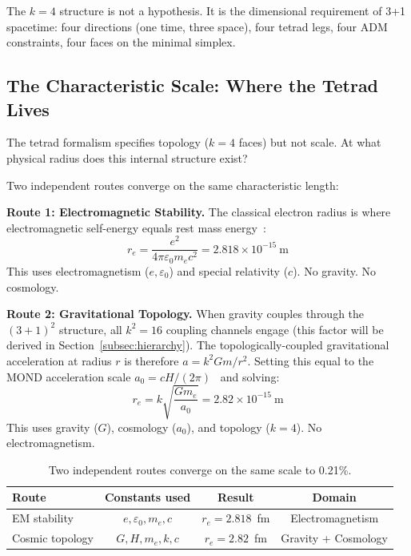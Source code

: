 \documentclass[aps,prd,preprint,superscriptaddress,showpacs,preprintnumbers,amsmath,amssymb,nofootinbib]{revtex4-2}
\begin{document}
The $k = 4$ structure is not a hypothesis. It is the dimensional requirement of 3+1 spacetime: four directions (one time, three space), four tetrad legs, four ADM constraints, four faces on the minimal simplex.

\subsection{The Characteristic Scale: Where the Tetrad Lives}
\label{subsec:scale}

The tetrad formalism specifies topology ($k = 4$ faces) but not scale. At what physical radius does this internal structure exist?

Two independent routes converge on the same characteristic length:

\textbf{Route 1: Electromagnetic Stability.} The classical electron radius is where electromagnetic self-energy equals rest mass energy~\cite{jackson1999}:
\begin{equation}
r_e = \frac{e^2}{4\pi\varepsilon_0 m_e c^2} = 2.818 \times 10^{-15}~\text{m}
\end{equation}
This uses electromagnetism ($e, \varepsilon_0$) and special relativity ($c$). No gravity. No cosmology.

\textbf{Route 2: Gravitational Topology.} When gravity couples through the $(3+1)^2$ structure, all $k^2 = 16$ coupling channels engage (this factor will be derived in Section~\ref{subsec:hierarchy}). The topologically-coupled gravitational acceleration at radius $r$ is therefore $a = k^2 Gm/r^2$. Setting this equal to the MOND acceleration scale $a_0 = cH/(2\pi)$~\cite{milgrom1983} and solving:
\begin{equation}
r_e = k\sqrt{\frac{Gm_e}{a_0}} = 2.82 \times 10^{-15}~\text{m}
\end{equation}
This uses gravity ($G$), cosmology ($a_0$), and topology ($k = 4$). No electromagnetism.

\begin{table}[H]
\centering
\begin{tabular*}{0.95\textwidth}{@{\extracolsep{\fill}} lccc @{}}
\toprule
\textbf{Route} & \textbf{Constants used} & \textbf{Result} & \textbf{Domain} \\
\midrule
EM stability & $e, \varepsilon_0, m_e, c$ & $r_e = 2.818$~fm & Electromagnetism \\
Cosmic topology & $G, H, m_e, k, c$ & $r_e = 2.82$~fm & Gravity + Cosmology \\
\bottomrule
\end{tabular*}
\caption{Two independent routes converge on the same scale to 0.21\%.}
\label{tab:convergence}
\end{table}
\end{document}
